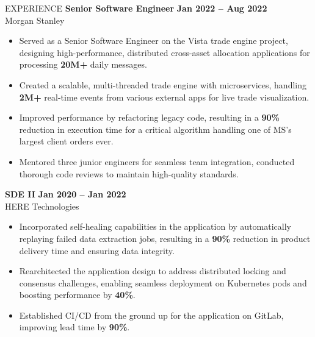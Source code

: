 \documentclass{resume} %
\begin{document}
\vspace{-4mm}




\begin{rSection}{EXPERIENCE}
\vspace{-1mm}
\textbf{Senior Software Engineer} \hfill \textbf{Jan 2022 – Aug 2022}\\
Morgan Stanley \hfill
\vspace{-3mm}
 \begin{itemize}
    \itemsep -8pt {} 
     \item Served as a Senior Software Engineer on the Vista trade engine project, designing high-performance, distributed cross-asset allocation applications for processing \textbf{20M+} daily messages.
     \item Created a scalable, multi-threaded trade engine with microservices, handling \textbf{2M+} real-time events from various external apps for live trade visualization.
     \item Improved performance by refactoring legacy code, resulting in a \textbf{90\%} reduction in execution time for a critical algorithm handling one of MS's largest client orders ever.
     \item Mentored three junior engineers for seamless team integration, conducted thorough code reviews to maintain high-quality standards.
 \end{itemize}
\vspace{-2mm}
\textbf{SDE II} \hfill \textbf{Jan 2020 – Jan 2022}\\
HERE Technologies \hfill 
\vspace{-3mm}
 \begin{itemize}
    \itemsep -8pt {} 
    \item Incorporated self-healing capabilities in the application by automatically replaying failed data extraction jobs, resulting in a \textbf{90\%} reduction in product delivery time and ensuring data integrity.
    \item Rearchitected the application design to address distributed locking and consensus challenges, enabling seamless deployment on Kubernetes pods and boosting performance by \textbf{40\%}.
    \item Established CI/CD from the ground up for the 
     application on GitLab, improving lead time by \textbf{90\%}.

\end{itemize}
\end{rSection}
\end{document}
